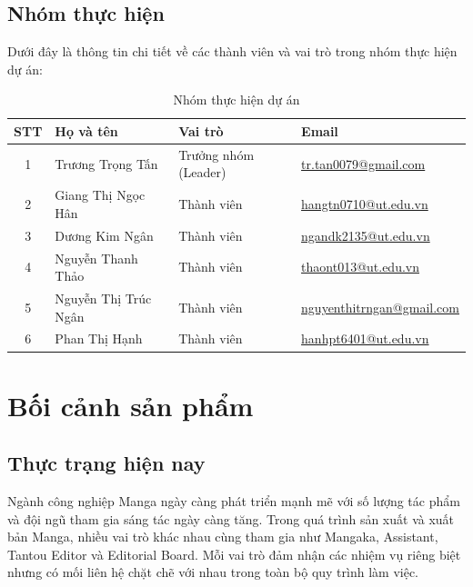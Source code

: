 \subsection{Nhóm thực hiện}
\label{subsec:nhom_thuc_hien}

Dưới đây là thông tin chi tiết về các thành viên và vai trò trong nhóm thực hiện dự án:

\begin{table}[H]
    \centering
    \renewcommand{\arraystretch}{1.3}
    \begin{tabularx}{\textwidth}{|c|l|l|>{\raggedright\arraybackslash}X|}
        \hline
        \rowcolor{tableheader}
        \textbf{STT} & \textbf{Họ và tên} & \textbf{Vai trò} & \textbf{Email} \rule[-1.2ex]{0pt}{4ex} \\
        \hline
        1 & Trương Trọng Tấn & Trưởng nhóm (Leader) & \href{mailto:tr.tan0079@gmail.com}{tr.tan0079@gmail.com} \\
        \hline
        2 & Giang Thị Ngọc Hân & Thành viên & \href{mailto:hangtn0710@ut.edu.vn}{hangtn0710@ut.edu.vn} \\
        \hline
        3 & Dương Kim Ngân & Thành viên & \href{mailto:ngandk2135@ut.edu.vn}{ngandk2135@ut.edu.vn} \\
        \hline
        4 & Nguyễn Thanh Thảo & Thành viên & \href{mailto:thaont013@ut.edu.vn}{thaont013@ut.edu.vn} \\
        \hline
        5 & Nguyễn Thị Trúc Ngân & Thành viên & \href{mailto:nguyenthitrngan@gmail.com}{nguyenthitrngan@gmail.com} \\
        \hline
        6 & Phan Thị Hạnh & Thành viên & \href{mailto:hanhpt6401@ut.edu.vn}{hanhpt6401@ut.edu.vn} \\
        \hline
    \end{tabularx}
    \caption{Nhóm thực hiện dự án}
    \label{tab:nhom_thuc_hien}
\end{table}

\section{Bối cảnh sản phẩm}
\label{sec:boi_canh_san_pham}

\subsection{Thực trạng hiện nay}
\label{subsec:thuc_trang_hien_nay}

Ngành công nghiệp Manga ngày càng phát triển mạnh mẽ với số lượng tác phẩm và đội ngũ tham gia sáng tác ngày càng tăng. Trong quá trình sản xuất và xuất bản Manga, nhiều vai trò khác nhau cùng tham gia như Mangaka, Assistant, Tantou Editor và Editorial Board. Mỗi vai trò đảm nhận các nhiệm vụ riêng biệt nhưng có mối liên hệ chặt chẽ với nhau trong toàn bộ quy trình làm việc.

